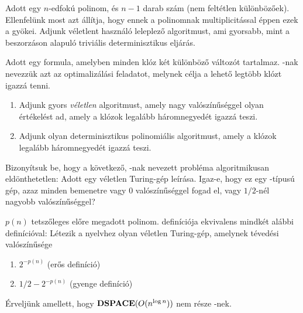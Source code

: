 \begin{Exercise}[counter={sorszam}, difficulty=-1]
Adott egy $n$-edfokú polinom, és $n-1$ darab szám (nem feltétlen
különbözőek). Ellenfelünk most azt állítja, hogy ennek a polinomnak
multiplicitással éppen ezek a gyökei. Adjunk véletlent használó
leleplező algoritmust, ami gyorsabb, mint a beszorzáson alapuló
triviális determinisztikus eljárás.
\end{Exercise}


\begin{Exercise}[counter={sorszam}, difficulty=0]
Adott egy  formula, amelyben minden klóz két különböző változót
tartalmaz. -nak nevezzük azt az optimalizálási feladatot, melynek célja
a lehető legtöbb klózt igazzá tenni.
\begin{enumerate}
 \item Adjunk gyors \emph{véletlen} algoritmust, amely nagy
valószínűséggel olyan értékelést ad, amely a klózok legalább háromnegyedét
igazzá teszi.
 \item Adjunk olyan determinisztikus polinomiális
algoritmust, amely a klózok legalább háromnegyedét igazzá teszi.
\end{enumerate}
\end{Exercise}


\begin{Exercise}[counter={sorszam}, difficulty=0]
Bizonyítsuk be, hogy a következő, -nak nevezett probléma algoritmikusan
eldönthetetlen: Adott egy véletlen Turing-gép leírása. Igaz-e, hogy ez egy \RP-típusú
gép, azaz minden bemenetre vagy 0 valószínűséggel fogad el, vagy $1/2$-nél nagyobb
valószínűséggel?
\end{Exercise}


\begin{Exercise}[counter={sorszam}, difficulty=0]
$p(n)$ tetszőleges előre megadott polinom. \BPP definíciója ekvivalens mindkét alábbi
definícióval: Létezik a nyelvhez olyan véletlen Turing-gép, amelynek tévedési valószínűsége
\begin{enumerate}
 \item $2^{-p(n)}$ (erős \BPP definíció)
 \item $1/2-2^{-p(n)}$ (gyenge \BPP definíció)
\end{enumerate}
\end{Exercise}


\begin{Exercise}[counter={sorszam}, difficulty=0]
Érveljünk amellett, hogy $\mbox{\ensuremath{\mathbf{DSPACE}}}(O(n^{\log n}))$ nem része \BPP-nek. 


\end{Exercise}

